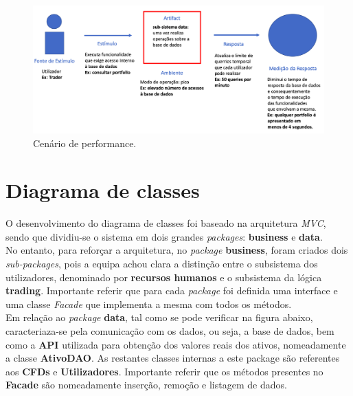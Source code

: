 \documentclass[11pt,a4paper]{report}%
\begin{document}
\begin{figure}[H]
	\centering
	\includegraphics[scale=0.35]{AQ_performace.png}
	\caption{Cenário de performance. }
	\label{img:pag}
\end{figure}

\newpage

\section{Diagrama de classes}

O desenvolvimento do diagrama de classes foi baseado na arquitetura \emph{MVC}, sendo que dividiu-se o sistema em dois grandes \emph{packages}: \textbf{business} e \textbf{data}. \\No entanto, para reforçar a arquitetura, no \emph{package} \textbf{business}, foram criados dois  \emph{sub-packages}, pois a equipa achou clara a distinção entre o subsistema dos utilizadores, denominado por \textbf{recursos humanos} e o subsistema da lógica \textbf{trading}. Importante referir que para cada \emph{package} foi definida uma interface e uma classe \emph{Facade} que implementa a mesma com todos os métodos.\\
\newline
Em relação ao \emph{package} \textbf{data}, tal como se pode verificar na figura abaixo, caracteriaza-se pela comunicação com os dados, ou seja, a base de dados, bem como a \textbf{API} utilizada para obtenção dos valores reais dos ativos, nomeadamente a classe \textbf{AtivoDAO}. As restantes classes internas a este package são referentes aos \textbf{CFDs} e \textbf{Utilizadores}. Importante referir que os métodos presentes no \textbf{Facade} são nomeadamente inserção, remoção e listagem de dados.
\end{document}
